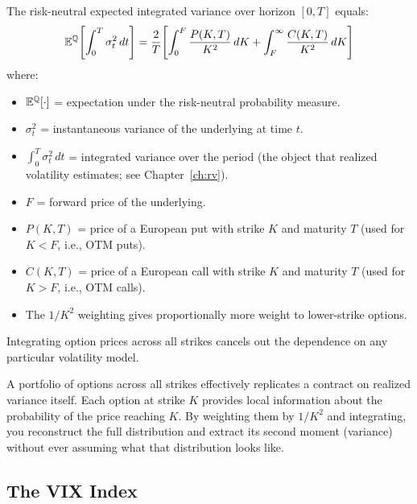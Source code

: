 \begin{keyresult}
\label{res:model-free}
The risk-neutral expected integrated variance over horizon $[0, T]$ equals:
\begin{equation}
  \mathbb{E}^{\mathbb{Q}}\!\left[\int_0^T \sigma_t^2\,dt\right]
  = \frac{2}{T}\!\left[\int_0^{F} \frac{P(K,T)}{K^2}\,dK
  + \int_{F}^{\infty} \frac{C(K,T)}{K^2}\,dK\right]
  \label{eq:model-free-var}
\end{equation}
where:
\begin{itemize}[nosep]
  \item $\mathbb{E}^{\mathbb{Q}}[\cdot]$ = expectation under the risk-neutral probability measure.
  \item $\sigma_t^2$ = instantaneous variance of the underlying at time $t$.
  \item $\int_0^T \sigma_t^2\,dt$ = integrated variance over the period (the object that realized volatility estimates; see Chapter~\ref{ch:rv}).
  \item $F$ = forward price of the underlying.
  \item $P(K,T)$ = price of a European put with strike $K$ and maturity $T$ (used for $K < F$, i.e., OTM puts).
  \item $C(K,T)$ = price of a European call with strike $K$ and maturity $T$ (used for $K > F$, i.e., OTM calls).
  \item The $1/K^2$ weighting gives proportionally more weight to lower-strike options.
\end{itemize}
Integrating option prices across all strikes cancels out the dependence on any particular volatility model.
\end{keyresult}

\begin{intuition}
A portfolio of options across all strikes effectively replicates a contract on realized variance itself.
Each option at strike $K$ provides local information about the probability of the price reaching $K$.
By weighting them by $1/K^2$ and integrating, you reconstruct the full distribution and extract its second moment (variance) without ever assuming what that distribution looks like.
\end{intuition}

\subsection{The VIX Index}
\label{sec:vix-index}

